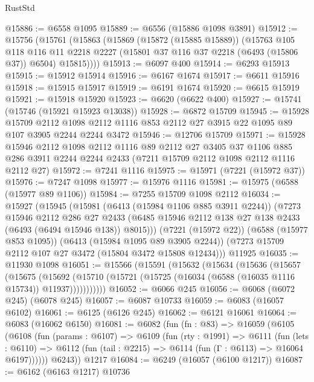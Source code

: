 \begin{lexlean}{RustStd}
\begin{coremodule}
@15886 := @6558 @1095
@15889 := @6556 (@15886 @1098 @3891)
@15912 := @15756
    (@15761
      (@15863
        (@15869
          (@15872 (@15885 @15889))
          (@15763
            @105
            @118
            @116
            @11
            @2218
            @2227
            (@15801 @37 @116 @37 @2218 (@6493 (@15806 @37)) @6504)
            @15815))))
@15913 := @6097 @400
@15914 := @6293 @15913
@15915 := @15912 @15914
@15916 := @6167 @1674
@15917 := @6611 @15916
@15918 := @15915 @15917
@15919 := @6191 @1674
@15920 := @6615 @15919
@15921 := @15918 @15920
@15923 := @6620 (@6622 @400)
@15927 := @15741 (@15746 (@15921 @15923 @13038))
@15928 := @6872 @15709
@15945 := @15928
    @15709
    @2112
    @1098
    @2112
    @1116
    @853
    @2112
    @27
    @3915
    @22
    @1095
    @89
    @107
    @3905
    @2244
    @2244
    @3472
@15946 := @12706 @15709
@15971 := @15928
    @15946
    @2112
    @1098
    @2112
    @1116
    @89
    @2112
    @27
    @3405
    @37
    @1106
    @885
    @286
    @3911
    @2244
    @2244
    @2433
    (@7211 @15709 @2112 @1098 @2112 @1116 @2112 @27)
@15972 := @7241 @1116
@15975 := @15971 (@7221 (@15972 @37))
@15976 := @7247 @1098
@15977 := @15976 @1116
@15981 := @15975 (@6588 (@15977 @89 @1106))
@15984 := @7255 @15709 @1098 @2112
@16034 := @15927
    (@15945
      (@15981
        (@6413 (@15984 @1106 @885 @3911 @2244))
        (@7273
          @15946
          @2112
          @286
          @27
          @2433
          (@6485 @15946 @2112 @138 @27 @138 @2433 (@6493 (@6494 @15946 @138)) @8015)))
      (@7221 (@15972 @22))
      (@6588 (@15977 @853 @1095))
      (@6413 (@15984 @1095 @89 @3905 @2244))
      (@7273 @15709 @2112 @107 @27 @3472 (@15804 @3472 @15808 @12434)))
    @11925
@16035 := @11930 @1098
@16051 := @15566
    (@15591
      (@15632
        (@15634
          (@15636
            (@15657
              (@15675
                (@15692
                  (@15710 (@15721 (@15725 (@16034 (@6588 (@16035 @1116 @15734)) @11937)))))))))))
@16052 := @6066 @245
@16056 := @6068 (@6072 @245) (@6078 @245)
@16057 := @6087 @10733
@16059 := @6083 (@16057 @6102)
@16061 := @6125 (@6126 @245)
@16062 := @6121 @16061
@16064 := @6083 (@16062 @6150)
@16081 := @6082
    (fun (fn : @83) =>
    @16059
      (@6105
        (@6108
          (fun (params : @6107) =>
          @6109
            (fun (rty : @1991) =>
            @6111
              (fun (lets : @6110) =>
              @6112 (fun (tail : @2215) => @6114 (fun (Γ : @6113) => @16064 @6197))))))
        @6243))
    @1217
@16084 := @6249 (@16057 (@6100 @1217))
@16087 := @6162 (@6163 @1217) @10736

\end{coremodule}
\end{lexlean}
